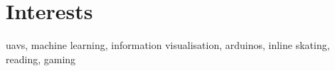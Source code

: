 \documentclass[]{friggeri-cv}
\begin{document}
%
%	
\section{Interests}
uavs, machine learning, information visualisation, arduinos, inline skating, reading, gaming
\end{document}
